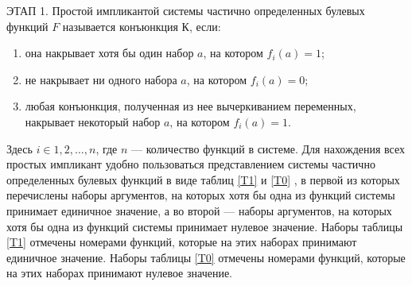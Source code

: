 \documentclass[12pt,a4paper]{article}
\begin{document}
ЭТАП 1. Простой импликантой системы частично определенных булевых функций $F$ называется конъюнкция $К$, если:
\begin{enumerate} 
\item  она накрывает хотя бы один набор $a$, на котором $f_i(a) = 1$;
\item  не накрывает ни одного набора $a$, на котором $f_i(a) = 0$;
\item  любая конъюнкция, полученная из нее вычеркиванием переменных, накрывает некоторый набор $a$, на котором $f_i(a) = 1$.
\end{enumerate} 

Здесь $i \in {1, 2, …, n}$, где $n$ — количество функций в системе.
Для нахождения всех простых импликант удобно пользоваться представлением системы частично определенных булевых функций в виде
таблиц \ref{T1} и \ref{T0} , в первой из которых перечислены наборы
аргументов, на которых хотя бы одна из функций системы принимает
единичное значение, а во второй — наборы аргументов, на которых хотя
бы одна из функций системы принимает нулевое значение. Наборы таблицы \ref{T1} отмечены номерами функций, которые на этих наборах принимают единичное значение. Наборы таблицы \ref{T0} отмечены номерами
функций, которые на этих наборах принимают нулевое значение.
\end{document}
